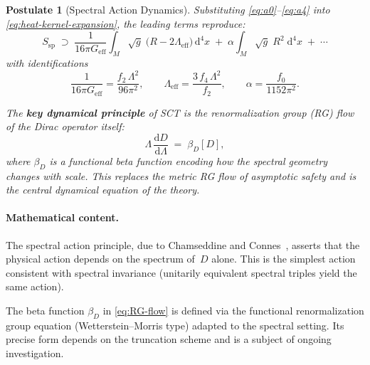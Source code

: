 \documentclass[12pt,a4paper]{article}
\theoremstyle{postulate}
\newtheorem{postulate}{Postulate}
\newcommand{\Dirac}{D}
\newcommand{\Cut}{\Lambda}
\newcommand{\Sspectral}{S_{\mathrm{sp}}}
\newcommand{\dd}{\mathrm{d}}
\begin{document}
\begin{postulate}[Spectral Action Dynamics]
\noindent
Substituting \eqref{eq:a0}--\eqref{eq:a4} into
\eqref{eq:heat-kernel-expansion}, the leading terms reproduce:
\begin{equation}\label{eq:EH-recovery}
  \Sspectral
  \;\supset\;
  \frac{1}{16\pi G_{\mathrm{eff}}}
  \int_M \sqrt{g}\;\bigl(R - 2\Lambda_{\mathrm{eff}}\bigr)\,\dd^4 x
  \;+\; \alpha\!\int_M \sqrt{g}\;R^2\;\dd^4 x
  \;+\; \cdots
\end{equation}
with identifications
\begin{equation}\label{eq:identifications}
  \frac{1}{16\pi G_{\mathrm{eff}}} = \frac{f_2\,\Cut^2}{96\pi^2},
  \qquad
  \Lambda_{\mathrm{eff}} = \frac{3\,f_4\,\Cut^2}{f_2},
  \qquad
  \alpha = \frac{f_0}{1152\pi^2}.
\end{equation}

The \textbf{key dynamical principle} of SCT is the renormalization group (RG)
flow of the Dirac operator itself:
\begin{equation}\label{eq:RG-flow}
  \Cut\,\frac{\dd\Dirac}{\dd\Cut} \;=\; \beta_{\Dirac}[\Dirac],
\end{equation}
where $\beta_{\Dirac}$ is a functional beta function encoding how the
spectral geometry changes with scale.  This replaces the metric RG flow of
asymptotic safety and is the central dynamical equation of the theory.
\end{postulate}

\paragraph{Mathematical content.}
The spectral action principle, due to Chamseddine and
Connes~\cite{Chamseddine1997}, asserts that the physical action depends on
the spectrum of~$\Dirac$ alone.  This is the simplest action consistent with
spectral invariance (unitarily equivalent spectral triples yield the same
action).

The beta function $\beta_{\Dirac}$ in \eqref{eq:RG-flow} is defined via the
functional renormalization group equation (Wetterstein--Morris type) adapted
to the spectral setting.  Its precise form depends on the truncation scheme
and is a subject of ongoing investigation.
\end{document}
